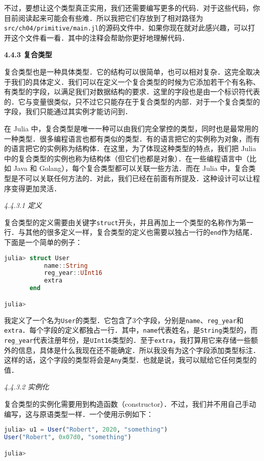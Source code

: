 不过，要想让这个类型真正实用，我们还需要编写更多的代码．对于这些代码，你目前阅读起来可能会有些难．所以我把它们存放到了相对路径为\verb|src/ch04/primitive/main.jl|的源码文件中．如果你现在就对此感兴趣，可以打开这个文件看一看．其中的注释会帮助你更好地理解代码．

\textbf{4.4.3 复合类型}

复合类型也是一种具体类型．它的结构可以很简单，也可以相对复杂．这完全取决于我们的具体定义．我们可以在定义一个复合类型的时候为它添加若干个有名称、有类型的字段，以满足我们对数据结构的要求．这里的字段也是由一个标识符代表的．它与变量很类似，只不过它只能存在于复合类型的内部．对于一个复合类型的字段，我们只能通过其实例才能访问到．

在 Julia 中，复合类型是唯一一种可以由我们完全掌控的类型，同时也是最常用的一种类型．很多编程语言也都有类似的类型．有的语言把它的实例称为对象，而有的语言把它的实例称为结构体．在这里，为了体现这种类型的特点，我们把 Julia 中的复合类型的实例也称为结构体（但它们也都是对象）．在一些编程语言中（比如 Java 和 Golang），每个复合类型都可以关联一些方法．而在 Julia 中，复合类型是不可以关联任何方法的．对此，我们已经在前面有所提及．这种设计可以让程序变得更加灵活．

\textsl{4.4.3.1 定义}

复合类型的定义需要由关键字\verb|struct|开头，并且再加上一个类型的名称作为第一行．与其他的很多定义一样，复合类型的定义也需要以独占一行的\verb|end|作为结尾．下面是一个简单的例子：

\begin{lstlisting}[language=julia]
julia> struct User
           name::String
           reg_year::UInt16
           extra
       end

julia> 
\end{lstlisting}

我定义了一个名为\verb|User|的类型．它包含了3个字段，分别是\verb|name|、\verb|reg_year|和\verb|extra|．每个字段的定义都独占一行．其中，\verb|name|代表姓名，是\verb|String|类型的，而\verb|reg_year|代表注册年份，是\verb|UInt16|类型的．至于\verb|extra|，我打算用它来存储一些额外的信息，具体是什么我现在还不能确定．所以我没有为这个字段添加类型标注．这样的话，这个字段的类型将会是\verb|Any|类型．也就是说，我可以赋给它任何类型的值．

\textsl{4.4.3.2 实例化}

复合类型的实例化需要用到构造函数（constructor）．不过，我们并不用自己手动编写，这与原语类型一样．一个使用示例如下：

\begin{lstlisting}[language=julia]
julia> u1 = User("Robert", 2020, "something")
User("Robert", 0x07d0, "something")

julia> 
\end{lstlisting}

